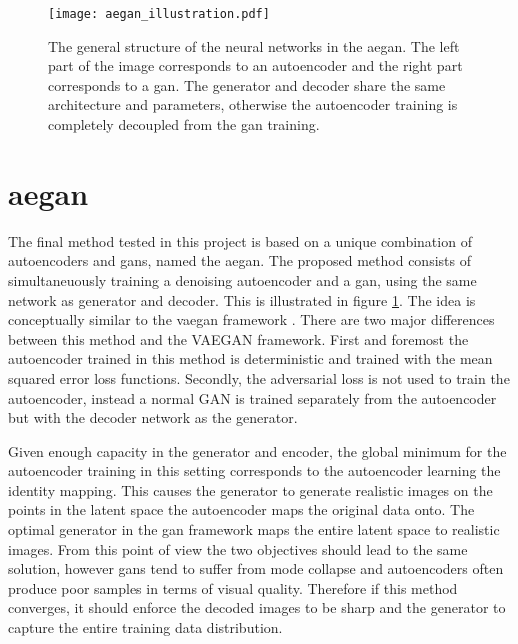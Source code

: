 \begin{figure}[t]
    \centering
    \texttt{[image: aegan\_illustration.pdf]}
    \caption{The general structure of the neural networks in the \acrlong{aegan}. The left part of the image corresponds to an autoencoder and the right part corresponds to a \acrshort{gan}. The generator and decoder share the same architecture and parameters, otherwise the autoencoder training is completely decoupled from the \acrshort{gan} training.}
    \label{fig:aegan}
\end{figure}

\section{\acrlong{aegan}}
The final method tested in this project is based on a unique combination of autoencoders and \acrshort{gans}, named the \acrfull{aegan}. The proposed method consists of simultaneuously training a denoising autoencoder and a \acrshort{gan}, using the same network as generator and decoder. This is illustrated in figure \ref{fig:aegan}. The idea is conceptually similar to the \acrshort{vaegan} framework \parencite{LarsenSW15autoencodingbeyond}. There are two major differences between this method and the VAEGAN framework. First and foremost the autoencoder trained in this method is deterministic and trained with the mean squared error loss functions. Secondly, the adversarial loss is not used to train the autoencoder, instead a normal GAN is trained separately from the autoencoder but with the decoder network as the generator. 

Given enough capacity in the generator and encoder, the global minimum for the autoencoder training in this setting corresponds to the autoencoder learning the identity mapping. This causes the generator to generate realistic images on the points in the latent space the autoencoder maps the original data onto. The optimal generator in the \acrshort{gan} framework maps the entire latent space to realistic images. From this point of view the two objectives should lead to the same solution, however \acrshort{gans} tend to suffer from mode collapse and autoencoders often produce poor samples in terms of visual quality. Therefore if this method converges, it should enforce the decoded images to be sharp and the generator to capture the entire training data distribution. 

